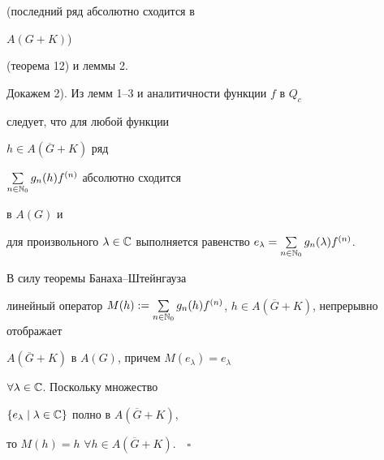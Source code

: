 (последний ряд абсолютно сходится в


$A(G+K)$)


\cite{IZVKOR} (теорема 12) и леммы 2.





Докажем 2). Из лемм 1--3 и аналитичности функции $f$ в $Q_c$


следует, что для любой функции


$h\in A(\overline{G}+K)$ ряд


$\sum\limits_{n\in\Bbb N_0}g_n(h)f^{(n)}$ абсолютно сходится


в $A(G)$ и


для произвольного $\lambda\in\Bbb C$ выполняется равенство $e_\lambda=


\sum\limits_{n\in\Bbb N_0}g_n(\lambda)f^{(n)}$.


В силу теоремы Банаха--Штейнгауза


линейный оператор $M(h):=\sum\limits_{n\in\Bbb N_0}


g_n(h)f^{(n)}$, $h\in A(\overline{G}+K)$, непрерывно отображает


$A(\overline{G}+K)$ в $A(G)$, причем $M(e_\lambda)=e_\lambda$


$\forall\lambda\in\Bbb C$. Поскольку множество


$\{e_\lambda\mid \lambda\in\Bbb C \}$ полно в $A(\overline{G}+K)$,


то $M(h)=h$ $\forall h\in A(\overline{G}+K)$.$\quad\square$





